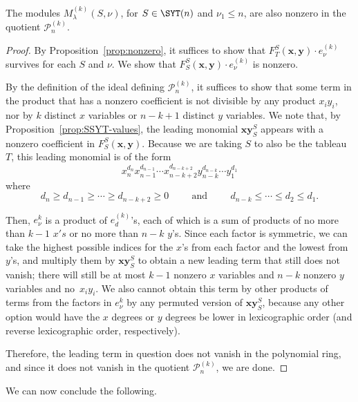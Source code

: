 \begin{lemma}\label{lem:still-nonzero}
	The modules $M^{(k)}_\lambda(S,\nu)$, for $S\in \SYT(n)$ and $\nu_1\le n$, are also nonzero in the quotient $\mathcal{P}_n^{(k)}$.
\end{lemma}

\begin{proof}
	By Proposition~\ref{prop:nonzero}, it suffices to show that $F_T^S(\mathbf{x},\mathbf{y})\cdot e_\nu^{(k)}$ survives for each $S$ and $\nu$.   We show that $F_S^S(\mathbf{x},\mathbf{y})\cdot e_\nu^{(k)}$ is nonzero.
	
	By the definition of the ideal defining $\mathcal{P}_n^{(k)}$, it suffices to show that some term in the product that has a nonzero coefficient is not divisible by any product $x_iy_i$, nor by $k$ distinct $x$ variables or $n-k+1$ distinct $y$ variables.  We note that, by Proposition~\ref{prop:SSYT-values}, the leading monomial $\mathbf{xy}_S^S$ appears with a nonzero coefficient in $F_S^S(\mathbf{x},\mathbf{y})$.  Because we are taking $S$ to also be the tableau $T$, this leading monomial is of the form $$x_n^{d_n}x_{n-1}^{d_{n-1}}\cdots x_{n-k+2}^{d_{n-k+2}} y_{n-k}^{d_{n-k}}\cdots y_1^{d_1}$$ where $$d_n\ge d_{n-1}\ge \cdots \ge d_{n-k+2}\ge 0\hspace{1cm}\text{and} \hspace{1cm} d_{n-k}\le \cdots \le d_2\le d_1.$$
	
	Then, $e_\nu^{k}$ is a product of $e_d^{(k)}$'s, each of which is a sum of products of no more than $k-1$ $x's$ or no more than $n-k$ $y$'s.  Since each factor is symmetric, we can take the highest possible indices for the $x$'s from each factor and the lowest from $y$'s, and multiply them by $\mathbf{xy}_S^S$ to obtain a new leading term that still does not vanish; there will still be at most $k-1$ nonzero $x$ variables and $n-k$ nonzero $y$ variables and no~$x_iy_i$.  We also cannot obtain this term by other products of terms from the factors in $e_\nu^{k}$ by any permuted version of $\mathbf{xy}_S^S$, because any other option would have the $x$ degrees or $y$ degrees be lower in lexicographic order (and reverse lexicographic order, respectively).  
	
	Therefore, the leading term in question does not vanish in the polynomial ring, and since it does not vanish in the quotient $\mathcal{P}_n^{(k)}$, we are done.
\end{proof}

We can now conclude the following.

